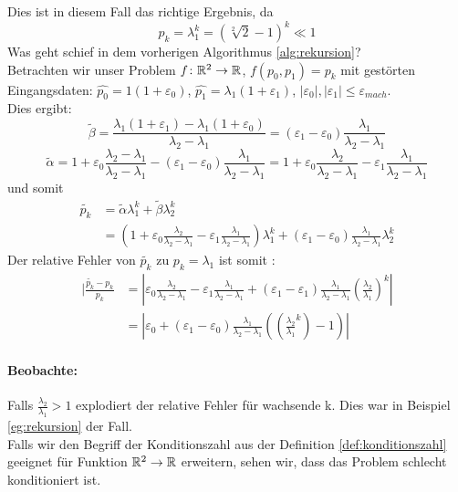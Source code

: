 

Dies ist in diesem Fall das richtige Ergebnis, da
\[
p_k=\lambda_1^{k}=(\sqrt[2]{2}-1)^{k} \ll 1 
\]
Was geht schief in dem vorherigen Algorithmus \ref{alg:rekursion}? \\
Betrachten wir unser Problem $f \colon \mathbb{R}^2 \to \mathbb{R}$, $f(p_0,p_1)=p_k$ mit gestörten Eingangsdaten: $\hat{p_0}= 1(1+\varepsilon_0)$, $\hat{p_1}= \lambda_1(1+\varepsilon_1)$, $|\varepsilon_0|, |\varepsilon_1|\le \varepsilon_{mach}$.\\
Dies ergibt:
\[
\tilde{\beta} = \frac{\lambda_1(1+\varepsilon_1)-\lambda_1(1+\varepsilon_0)}{\lambda_2-\lambda_1}= (\varepsilon_1-\varepsilon_0) \frac{\lambda_1}{\lambda_2-\lambda_1}
\]
\[
\tilde{\alpha} = 1+ \varepsilon_0 \frac{\lambda_2-\lambda_1}{\lambda_2-\lambda_1}-(\varepsilon_1-\varepsilon_0) \frac{\lambda_1}{\lambda_2-\lambda_1}= 1+\varepsilon_0 \frac{\lambda_2}{\lambda_2-\lambda_1}- \varepsilon_1 \frac{\lambda_1}{\lambda_2-\lambda_1}
\]
und somit
\begin{align*}
\tilde{p_k} 
&= \tilde{\alpha} \lambda_1^{k}+ \tilde{\beta} \lambda_2^{k}\\
&=(1+\varepsilon_0 \frac{\lambda_2}{\lambda_2-\lambda_1}-\varepsilon_1 \frac{\lambda_1}{\lambda_2-\lambda_1})\lambda_1^{k}+(\varepsilon_1 -\varepsilon_0) \frac{\lambda_1}{\lambda_2-\lambda_1} \lambda_2^{k}
\end{align*}
Der relative Fehler von $\tilde{p_k}$ zu $p_k= \lambda_1$ ist somit :
\begin{align*}
	|\frac{\tilde{p_k}-p_k}{p_k}
	&= |\varepsilon_0 \frac{\lambda_2}{\lambda_2-\lambda_1} -\varepsilon_1 \frac{\lambda_1}{\lambda_2-\lambda_1} + (\varepsilon_1-\varepsilon_1) \frac{\lambda_1}{\lambda_2-\lambda_1}(\frac{\lambda_2}{\lambda_1})^{k}| \\
	&= | \varepsilon_0 + (\varepsilon_1-\varepsilon_0) \frac{\lambda_1}{\lambda_2-\lambda_1} \left( \left( \frac{\lambda_2}{\lambda_1}^{k} \right)-1 \right)|
\end{align*}
\paragraph{Beobachte:}Falls $\frac{\lambda_2}{\lambda_1}>1$ explodiert der relative Fehler für wachsende k. Dies war in Beispiel \ref{eg:rekursion} der Fall. \\
Falls wir den Begriff der Konditionszahl aus der Definition \ref{def:konditionszahl} geeignet für Funktion $\mathbb{R}^2 \to \mathbb{R}$ erweitern, sehen wir, dass das Problem schlecht konditioniert ist.
